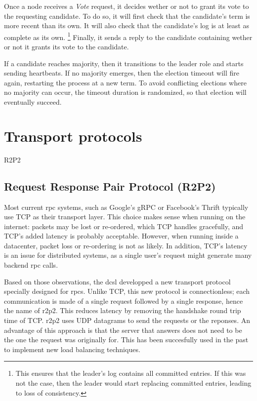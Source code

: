 Once a node receives a \emph{Vote} request, it decides wether or not to grant its vote to the requesting candidate.
To do so, it will first check that the candidate's term is more recent than its own.
It will also check that the candidate's log is at least as complete as its own.
\footnote{This ensures that the leader's log contains all committed entries.
    If this was not the case, then the leader would start replacing committed entries, leading to loss of consistency.
}
Finally, it sends a reply to the candidate containing wether or not it grants its vote to the candidate.

If a candidate reaches majority, then it transitions to the leader role and starts sending heartbeats.
If no majority emerges, then the election timeout will fire again, restarting the process at a new term.
To avoid conflicting elections where no majority can occur, the timeout duration is randomized, so that election will eventually succeed.


\section{Transport protocols}

R2P2

\subsection{Request Response Pair Protocol (R2P2)}

Most current \gls{rpc} systems, such as Google's gRPC\cite{grpc} or Facebook's Thrift\cite{thrift} typically use TCP as their transport layer.
This choice makes sense when running on the internet: packets may be lost or re-ordered, which TCP handles gracefully, and TCP's added latency is probably acceptable.
However, when running inside a datacenter, packet loss or re-ordering is not as likely.
In addition, TCP's latency is an issue for distributed systems, as a single user's request might generate many backend \gls{rpc} calls.

Based on those observations, the \gls{dcsl} developped a new transport protocol specially designed for \glspl{rpc}.
Unlike TCP, this new protocol is connectionless; each communication is made of a single request followed by a single response, hence the name of \gls{r2p2}.
This reduces latency by removing the handshake round trip time of TCP.
\gls{r2p2} uses UDP datagrams to send the requests or the reponses.
An advantage of this approach is that the server that answers does not need to be the one the request was originally for.
This has been succesfully used in the past to implement new load balancing techniques\cite{r2p2}.

